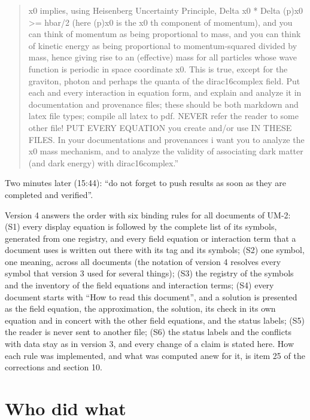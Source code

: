 \documentclass[
  10pt,
]{article}
\begin{document}
\begin{quote}
x0 implies, using Heisenberg Uncertainty Principle, Delta x0 * Delta
(p)x0 \textgreater= hbar/2 (here (p)x0 is the x0 th component of
momentum), and you can think of momentum as being proportional to mass,
and you can think of kinetic energy as being proportional to
momentum-squared divided by mass, hence giving rise to an (effective)
mass for all particles whose wave function is periodic in space
coordinate x0. This is true, except for the graviton, photon and perhaps
the quanta of the dirac16complex field. Put each and every interaction
in equation form, and explain and analyze it in documentation and
provenance files; these should be both markdown and latex file types;
compile all latex to pdf. NEVER refer the reader to some other file! PUT
EVERY EQUATION you create and/or use IN THESE FILES. In your
documentations and provenances i want you to analyze the x0 mass
mechanism, and to analyze the validity of associating dark matter (and
dark energy) with dirac16complex.''
\end{quote}

Two minutes later (15:44): ``do not forget to push results as soon as
they are completed and verified''.

Version 4 answers the order with six binding rules for all documents of
UM-2: (S1) every display equation is followed by the complete list of
its symbols, generated from one registry, and every field equation or
interaction term that a document uses is written out there with its tag
and its symbols; (S2) one symbol, one meaning, across all documents (the
notation of version 4 resolves every symbol that version 3 used for
several things); (S3) the registry of the symbols and the inventory of
the field equations and interaction terms; (S4) every document starts
with ``How to read this document'', and a solution is presented as the
field equation, the approximation, the solution, its check in its own
equation and in concert with the other field equations, and the status
labels; (S5) the reader is never sent to another file; (S6) the status
labels and the conflicts with data stay as in version 3, and every
change of a claim is stated here. How each rule was implemented, and
what was computed anew for it, is item 25 of the corrections and section
10.

\hypertarget{who-did-what}{%
\section{Who did what}\label{who-did-what}}
\end{document}
